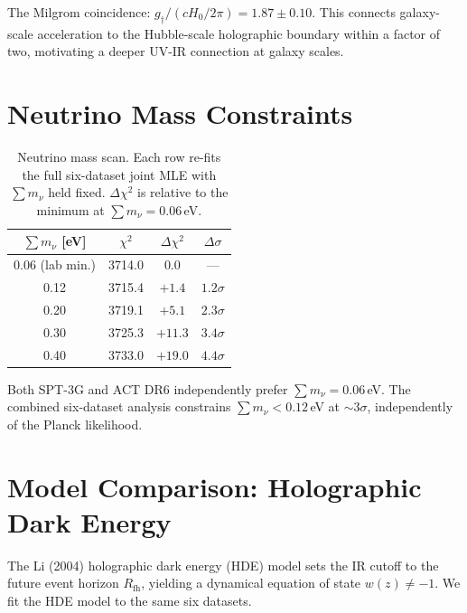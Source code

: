 \documentclass[12pt,a4paper]{article}
\begin{document}
The Milgrom coincidence: $g_\dagger/(cH_0/2\pi) = 1.87 \pm 0.10$.
This connects galaxy-scale acceleration to the Hubble-scale holographic
boundary within a factor of two, motivating a deeper UV-IR connection
at galaxy scales.

\section{Neutrino Mass Constraints}
\label{sec:neutrino}

\begin{table}[h]
\centering
\caption{Neutrino mass scan. Each row re-fits the full six-dataset joint
MLE with $\sum m_\nu$ held fixed. $\Delta\chi^2$ is relative to the
minimum at $\sum m_\nu = 0.06\,$eV.}
\label{tab:neutrino}
\begin{tabular}{@{}cccc@{}}
\toprule
$\sum m_\nu$ [eV] & $\chi^2$ & $\Delta\chi^2$ & $\Delta\sigma$ \\
\midrule
0.06 (lab min.) & 3714.0 & 0.0 & --- \\
0.12 & 3715.4 & $+1.4$ & $1.2\sigma$ \\
0.20 & 3719.1 & $+5.1$ & $2.3\sigma$ \\
0.30 & 3725.3 & $+11.3$ & $3.4\sigma$ \\
0.40 & 3733.0 & $+19.0$ & $4.4\sigma$ \\
\bottomrule
\end{tabular}
\end{table}

Both SPT-3G and ACT DR6 independently prefer $\sum m_\nu = 0.06\,$eV.
The combined six-dataset analysis constrains $\sum m_\nu < 0.12\,$eV
at $\sim 3\sigma$, independently of the Planck likelihood.

\section{Model Comparison: Holographic Dark Energy}
\label{sec:model_comparison}

The Li (2004) holographic dark energy (HDE) model sets the IR cutoff
to the future event horizon $R_\mathrm{fh}$, yielding a dynamical
equation of state $w(z) \neq -1$.
We fit the HDE model to the same six datasets.
\end{document}
